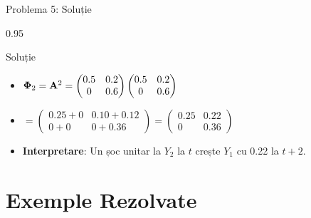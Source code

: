 \documentclass[9pt, aspectratio=169, t]{beamer}
\begin{document}
\begin{frame}{Problema 5: Soluție}
    \begin{cminipage}{0.95\textwidth}
    \begin{exampleblock}{Soluție}
        \begin{itemize}\setlength{\itemsep}{0pt}
            \item $\boldsymbol{\Phi}_2 = \mathbf{A}^2 = \begin{pmatrix} 0.5 & 0.2 \\ 0 & 0.6 \end{pmatrix} \begin{pmatrix} 0.5 & 0.2 \\ 0 & 0.6 \end{pmatrix}$
            \item $= \begin{pmatrix} 0.25 + 0 & 0.10 + 0.12 \\ 0 + 0 & 0 + 0.36 \end{pmatrix} = \begin{pmatrix} 0.25 & 0.22 \\ 0 & 0.36 \end{pmatrix}$
            \item \textbf{Interpretare}: Un șoc unitar la $Y_2$ la $t$ crește $Y_1$ cu 0.22 la $t+2$.
        \end{itemize}
    \end{exampleblock}
    \end{cminipage}
\end{frame}

\section{Exemple Rezolvate}
\end{document}
